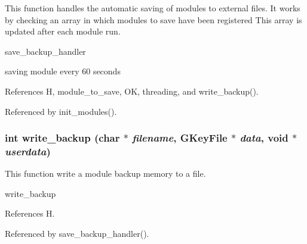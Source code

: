 This function handles the automatic saving of modules to external files. It works by checking an array in which modules to save have been registered This array is updated after each module run. 

save\_\-backup\_\-handler 

saving module every 60 seconds 

References H, module\_\-to\_\-save, OK, threading, and write\_\-backup().

Referenced by init\_\-modules().
\subsubsection[{write\_\-backup}]{\setlength{\rightskip}{0pt plus 5cm}int write\_\-backup (char $\ast$ {\em filename}, \/  GKeyFile $\ast$ {\em data}, \/  void $\ast$ {\em userdata})}\label{modules_8c_6192a290b974369920784a792fc1044b}


This function write a module backup memory to a file. 

write\_\-backup 

References H.

Referenced by save\_\-backup\_\-handler().
